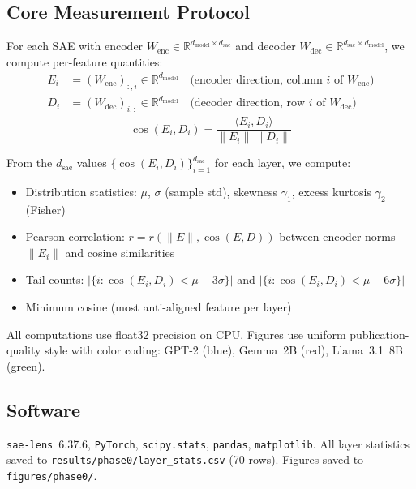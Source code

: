\documentclass[11pt,a4paper]{article}
\newcommand{\cosED}{\cos(E_i, D_i)}
\newcommand{\rPearson}{r(\|E\|, \cos(E,D))}
\begin{document}
\subsection{Core Measurement Protocol}

For each SAE with encoder $W_\text{enc} \in \mathbb{R}^{d_\text{model} \times d_\text{sae}}$ and decoder $W_\text{dec} \in \mathbb{R}^{d_\text{sae} \times d_\text{model}}$, we compute per-feature quantities:
\begin{align}
  E_i &= (W_\text{enc})_{:,i} \in \mathbb{R}^{d_\text{model}} \quad \text{(encoder direction, column $i$ of $W_\text{enc}$)} \\
  D_i &= (W_\text{dec})_{i,:} \in \mathbb{R}^{d_\text{model}} \quad \text{(decoder direction, row $i$ of $W_\text{dec}$)}
\end{align}
\begin{equation}
  \cosED = \frac{\langle E_i, D_i \rangle}{\|E_i\|\,\|D_i\|}
\end{equation}

From the $d_\text{sae}$ values $\{\cosED\}_{i=1}^{d_\text{sae}}$ for each layer, we compute:
\begin{itemize}[nosep]
  \item Distribution statistics: $\mu$, $\sigma$ (sample std), skewness $\gamma_1$, excess kurtosis $\gamma_2$ (Fisher)
  \item Pearson correlation: $r = \rPearson$ between encoder norms $\|E_i\|$ and cosine similarities
  \item Tail counts: $|\{i : \cosED < \mu - 3\sigma\}|$ and $|\{i : \cosED < \mu - 6\sigma\}|$
  \item Minimum cosine (most anti-aligned feature per layer)
\end{itemize}

All computations use float32 precision on CPU. Figures use uniform publication-quality style with color coding: \textcolor[HTML]{1f77b4}{GPT-2 (blue)}, \textcolor[HTML]{d62728}{Gemma~2B (red)}, \textcolor[HTML]{2ca02c}{Llama~3.1~8B (green)}.

\subsection{Software}

\texttt{sae-lens}~6.37.6, \texttt{PyTorch}, \texttt{scipy.stats}, \texttt{pandas}, \texttt{matplotlib}. All layer statistics saved to \texttt{results/phase0/layer\_stats.csv} (70 rows). Figures saved to \texttt{figures/phase0/}.
\end{document}
